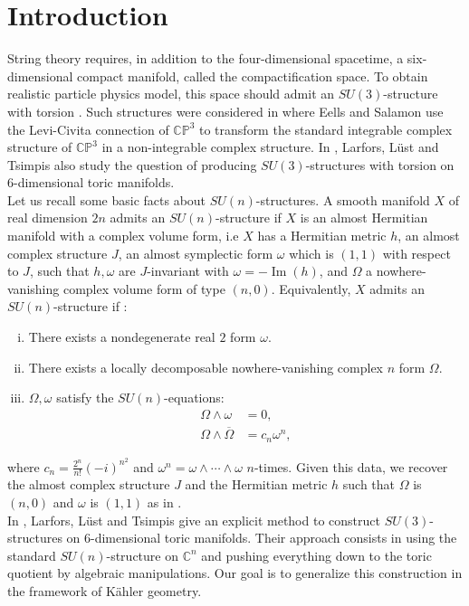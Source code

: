 \documentclass[12pt, reqno]{amsart}
\DeclareMathOperator\Ima{Im}
\newcommand{\C}{\mathbb{C}}
\newcommand{\p}{\mathbb{P}}
\begin{document}
\section{Introduction}
 String theory requires, in addition to the four-dimensional spacetime, a six-dimensional compact manifold, called the compactification space. To obtain realistic particle physics model, this space should admit an $SU(3)$-structure with torsion \cite{Gra_a_2006}. Such structures were considered in \cite{EellsSalamon} where Eells and Salamon use the Levi-Civita connection of $\C\p^3$ to transform the standard integrable complex structure of $\C\p^3$ in a non-integrable complex structure. In \cite{Larfors_2010,Larfors_2013}, Larfors, Lüst and Tsimpis also study the question of producing $SU(3)$-structures with torsion on $6$-dimensional toric manifolds.\\
\indent Let us recall some basic facts about $SU(n)$-structures. A smooth manifold $X$ of real dimension $2n$ admits an $SU(n)$-structure if $X$ is an almost Hermitian manifold with a complex volume form, i.e $X$ has a Hermitian metric $h$, an almost complex structure $J$, an almost symplectic form $\omega$ which is $(1,1)$ with respect to $J$, such that $h,\omega$ are $J$-invariant with $\omega=-\Ima(h)$, and $\Omega$ a nowhere-vanishing complex volume form of type $(n,0)$. Equivalently, $X$ admits an $SU(n)$-structure if :
\begin{enumerate}[i)]
    \item There exists a nondegenerate real $2$ form $\omega$.
    \item There exists a locally decomposable nowhere-vanishing complex $n$ form $\Omega$.
    \item $\Omega,\omega$ satisfy the $SU(n)$-equations:
    \begin{align}
        \Omega\wedge\omega&=0\label{SU(n)eq1},\\
        \Omega\wedge\overline{\Omega}&=c_n\omega^n,\label{SU(n)eq2}
    \end{align}
\end{enumerate}
where $c_n=\frac{2^n}{n!}(-i)^{n^2}$ and $\omega^n=\omega\wedge\cdots\wedge\omega$ $n$-times. Given this data, we recover the almost complex structure $J$ and the Hermitian metric $h$ such that $\Omega$ is $(n,0)$ and $\omega$ is $(1,1)$ as in \cite{cpxstructuresun}
. \\
\indent In \cite{Larfors_2010}, Larfors, Lüst and Tsimpis give an explicit method to construct $SU(3)$-structures on $6$-dimensional toric manifolds. Their approach consists in using the standard $SU(n)$-structure on $\C^n$ and pushing everything down to the toric quotient by algebraic manipulations. Our goal is to generalize this construction in the framework of Kähler geometry.  
\end{document}
